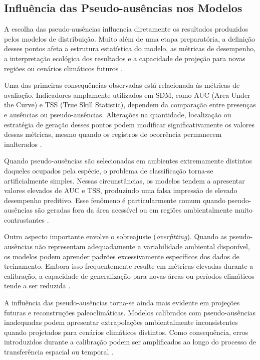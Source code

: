 \subsection{Influência das Pseudo-ausências nos Modelos}

A escolha das pseudo-ausências influencia diretamente os resultados produzidos pelos modelos de distribuição. Muito além de uma etapa preparatória, a definição desses pontos afeta a estrutura estatística do modelo, as métricas de desempenho, a interpretação ecológica dos resultados e a capacidade de projeção para novas regiões ou cenários climáticos futuros \citep{lobo2010uncertain}.

Uma das primeiras consequências observadas está relacionada às métricas de avaliação. Indicadores amplamente utilizados em SDM, como AUC (Area Under the Curve) e TSS (True Skill Statistic), dependem da comparação entre presenças e ausências ou pseudo-ausências. Alterações na quantidade, localização ou estratégia de geração desses pontos podem modificar significativamente os valores dessas métricas, mesmo quando os registros de ocorrência permanecem inalterados \citep{allouche2006assessing}.

Quando pseudo-ausências são selecionadas em ambientes extremamente distintos daqueles ocupados pela espécie, o problema de classificação torna-se artificialmente simples. Nessas circunstâncias, os modelos tendem a apresentar valores elevados de AUC e TSS, produzindo uma falsa impressão de elevado desempenho preditivo. Esse fenômeno é particularmente comum quando pseudo-ausências são geradas fora da área acessível ou em regiões ambientalmente muito contrastantes \citep{barve2011crucial}.

Outro aspecto importante envolve o sobreajuste (\textit{overfitting}). Quando as pseudo-ausências não representam adequadamente a variabilidade ambiental disponível, os modelos podem aprender padrões excessivamente específicos dos dados de treinamento. Embora isso frequentemente resulte em métricas elevadas durante a calibração, a capacidade de generalização para novas áreas ou períodos climáticos tende a ser reduzida \citep{elith2009species}.

A influência das pseudo-ausências torna-se ainda mais evidente em projeções futuras e reconstruções paleoclimáticas. Modelos calibrados com pseudo-ausências inadequadas podem apresentar extrapolações ambientalmente inconsistentes quando projetados para cenários climáticos distintos. Como consequência, erros introduzidos durante a calibração podem ser amplificados ao longo do processo de transferência espacial ou temporal \citep{peterson2011ecological}.

